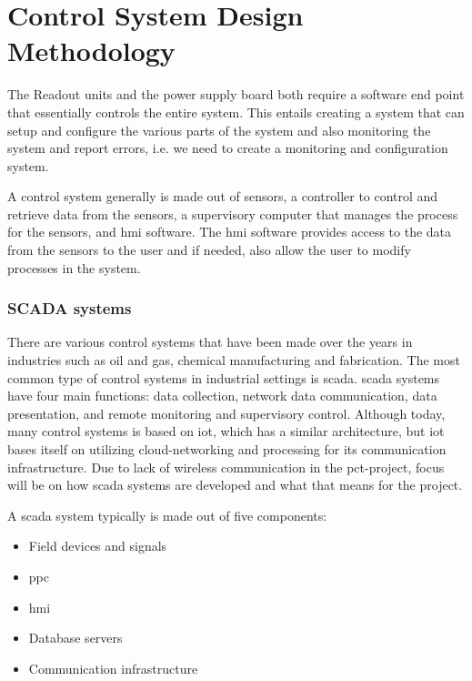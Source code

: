 \documentclass[main.tex]{subfiles}
\begin{document}
\section{Control System Design Methodology}

The Readout units and the power supply board both require a software end point that essentially controls the entire system. This entails creating a system that can setup and configure the various parts of the system and also monitoring the system and report errors, i.e. we need to create a monitoring and configuration system.

A control system generally is made out of sensors, a controller to control and retrieve data from the sensors, a supervisory computer that manages the process for the sensors, and \gls{hmi} software. The \gls{hmi} software provides access to the data from the sensors to the user and if needed, also allow the user to modify processes in the system.


\subsubsection{SCADA systems}
There are various control systems that have been made over the years in industries such as oil and gas, chemical manufacturing and fabrication. The most common type of control systems in industrial settings is \gls{scada}. \gls{scada} systems have four main functions: data collection, network data communication, data presentation, and remote monitoring and supervisory control\cite{scada_intro}. Although today, many control systems is based on \gls{iot}, which has a similar architecture, but \gls{iot} bases itself on utilizing cloud-networking and processing for its communication infrastructure. Due to lack of wireless communication in the \gls{pct}-project, focus will be on how \gls{scada} systems are developed and what that means for the project.

A \gls{scada} system typically is made out of five components:

\begin{itemize}
    \item Field devices and signals
    \item \acrfull{ppc}
    \item \acrfull{hmi}
    \item Database servers
    \item Communication infrastructure
\end{itemize}
\end{document}
